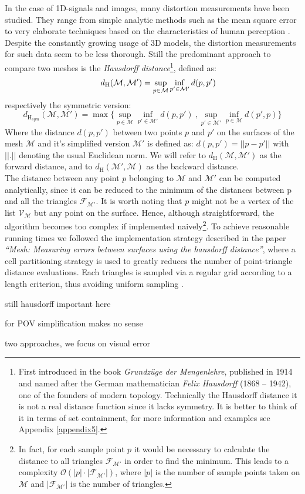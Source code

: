 In the case of 1D-signals and images, many distortion measurements have been studied.
They range from simple analytic methods such as the mean square error to very elaborate techniques based on the characteristics of human perception \citep[cf.][]{Winkler2001}.
Despite the constantly growing usage of 3D models, the distortion measurements for such data seem to be less thorough.
Still the predominant approach to compare two meshes is the \textit{Hausdorff distance}\footnote{ First introduced in the book \textit{Grundzüge der Mengenlehre}, published in 1914 and named after the German mathematician \textit{Felix Hausdorff} (1868 – 1942), one of the founders of modern topology. Technically the Hausdorff distance it is not a real distance function since it lacks symmetry. It is better to think of it in terms of set containment, for more information and examples see Appendix \ref{appendix5}.}, defined as:
\begin{equation} \label{eq:hausdorff}
\hspace*{0.5cm} d_{\mathrm H}(\mathcal{M},\mathcal{M}') = \sup_{p \in \mathcal{M}} \inf_{p' \in \mathcal{M}'} d(p, p')
\end{equation}
respectively the symmetric version:
\begin{equation}
d_{\mathrm H_{sym}}(\mathcal{M},\mathcal{M}') = \max \{\sup_{p \in \mathcal{M}} \inf_{p' \in \mathcal{M}'} d(p, p')~, \sup_{p' \in \mathcal{M}'} \inf_{p \in \mathcal{M}} d(p', p)\}
\end{equation}
Where the distance $d(p, p')$ between two points $p$ and $p'$ on the surfaces of the mesh $\mathcal{M}$ and it's simplified version $\mathcal{M}'$ is defined as: $d(p, p') = || p-p' ||$ with $||.||$ denoting the usual Euclidean norm.
We will refer to $d_{\mathrm H}(\mathcal{M},\mathcal{M}')$ as the forward distance, and to $d_{\mathrm H}(\mathcal{M}',\mathcal{M})$ as the backward distance.\\
The distance between any point $p$ belonging to $\mathcal{M}$ and $\mathcal{M}'$ can be computed analytically, since it can be reduced to the minimum of the distances between p and all the triangles $\mathcal{F}_{\mathcal{M}'}$.
It is worth noting that $p$ might not be a vertex of the list $\mathcal{V}_{\mathcal{M}}$ but any point on the surface.
Hence, although straightforward, the algorithm becomes too complex if implemented naively\footnote{ In fact, for each sample point $p$ it would be necessary to calculate the distance to all triangles $\mathcal{F}_{\mathcal{M}'}$ in order to find the minimum.
This leads to a complexity $\mathcal{O}(|p| \cdot |\mathcal{F}_{\mathcal{M}'}|)$, where $|p|$ is the number of sample points taken on $\mathcal{M}$ and $|\mathcal{F}_{\mathcal{M}'}|$ is the number of triangles.}.
To achieve reasonable running times we followed the implementation strategy described in the paper \textit{``Mesh: Measuring errors between surfaces using the hausdorff distance''}, where a cell partitioning strategy is used to greatly reduces the number of point-triangle distance evaluations.
Each triangles is sampled via a regular grid according to a length criterion, thus avoiding uniform sampling \citep[for more details see][especially chapter 3]{Aspert2002}.

still hausdorff important here

for POV simplification makes no sense

two approaches, we focus on visual error

